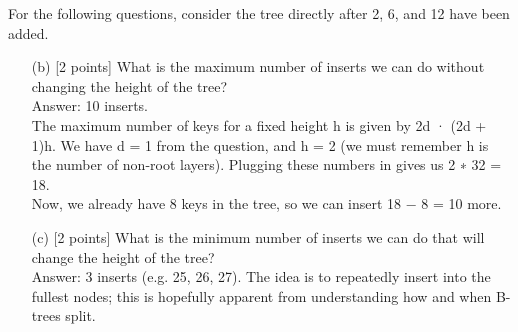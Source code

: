 \documentclass[10pt]{article}
\begin{document}
\noindent For the following questions, consider the tree directly after 2, 6, and 12 have been added.
\begin{enumerate}
    \item[(b)] [2 points] What is the maximum number of inserts we can do without changing the height of the tree?\\ 
    {\color{red} Answer: 10 inserts. \\ The maximum number of keys for a fixed height h is given by 2d · (2d + 1)h.
    We have d = 1 from the question, and h = 2 (we must remember h is the number of non-root layers).
    Plugging these numbers in gives us 2 ∗ 32 = 18.\\
    Now, we already have 8 keys in the tree, so we can insert 18 − 8 = 10 more.}
 \item[(c)][2 points] What is the minimum number of inserts we can do that will change the height of the tree?\\ {\color{red} Answer: 3 inserts (e.g. 25, 26, 27).
The idea is to repeatedly insert into the fullest nodes; this is hopefully apparent from understanding
how and when B-trees split.}
\end{enumerate}
\end{document}
